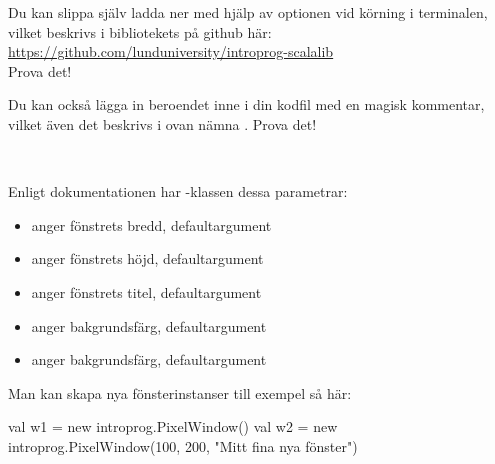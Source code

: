 \Subtask Du kan slippa själv ladda ner  med hjälp av optionen  vid körning i terminalen, vilket beskrivs i bibliotekets  på github här: \\\url{https://github.com/lunduniversity/introprog-scalalib} \\Prova det!

\Subtask Du kan också lägga in beroendet inne i din kodfil med en magisk kommentar, vilket även det beskrivs i ovan nämna . Prova det!







\SOLUTION

\TaskSolved \what~

\SubtaskSolved Enligt dokumentationen har -klassen dessa parametrar:
\begin{itemize}[nolistsep,noitemsep]
  \item {} anger fönstrets bredd, defaultargument 
  \item {} anger fönstrets höjd, defaultargument 
  \item {} anger fönstrets titel, defaultargument 
  \item {} anger bakgrundsfärg, defaultargument 
  \item {} anger bakgrundsfärg, defaultargument 
\end{itemize}
Man kan skapa nya fönsterinstanser till exempel så här:
\begin{Code}
val w1 = new introprog.PixelWindow()
val w2 = new introprog.PixelWindow(100, 200, "Mitt fina nya fönster")
\end{Code}

